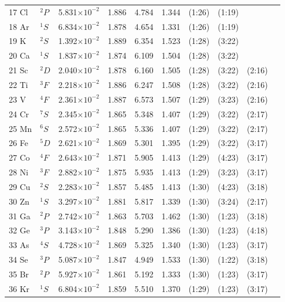 \documentclass[12pt]{report}
\begin{document}
\begin{longtable}{l l r r r r r r r r}
17 Cl & $^{2}P$ & 5.831$\times10^{-2}$ & 1.886 & 4.784 & 1.344 & (1:26) & (1:19)     \\
18 Ar & $^{1}S$ & 6.834$\times10^{-2}$ & 1.878 & 4.654 & 1.331 & (1:26) & (1:19)     \\
19 K & $^{2}S$ & 1.392$\times10^{-2}$ & 1.889 & 6.354 & 1.523 & (1:28) & (3:22)     \\
20 Ca & $^{1}S$ & 1.837$\times10^{-2}$ & 1.874 & 6.109 & 1.504 & (1:28) & (3:22)     \\
21 Sc & $^{2}D$ & 2.040$\times10^{-2}$ & 1.878 & 6.160 & 1.505 & (1:28) & (3:22) & (2:16)   \\
22 Ti & $^{3}F$ & 2.218$\times10^{-2}$ & 1.886 & 6.247 & 1.508 & (1:28) & (3:22) & (2:16)   \\
23 V & $^{4}F$ & 2.361$\times10^{-2}$ & 1.887 & 6.573 & 1.507 & (1:29) & (3:23) & (2:16)   \\
24 Cr & $^{7}S$ & 2.345$\times10^{-2}$ & 1.865 & 5.348 & 1.407 & (1:29) & (3:22) & (2:17)   \\
25 Mn & $^{6}S$ & 2.572$\times10^{-2}$ & 1.865 & 5.336 & 1.407 & (1:29) & (3:22) & (2:17)   \\
26 Fe & $^{5}D$ & 2.621$\times10^{-2}$ & 1.869 & 5.301 & 1.395 & (1:29) & (3:22) & (3:17)   \\
27 Co & $^{4}F$ & 2.643$\times10^{-2}$ & 1.871 & 5.905 & 1.413 & (1:29) & (4:23) & (3:17)   \\
28 Ni & $^{3}F$ & 2.882$\times10^{-2}$ & 1.875 & 5.935 & 1.413 & (1:29) & (3:23) & (3:17)   \\
29 Cu & $^{2}S$ & 2.283$\times10^{-2}$ & 1.857 & 5.485 & 1.413 & (1:30) & (4:23) & (3:18)   \\
30 Zn & $^{1}S$ & 3.297$\times10^{-2}$ & 1.881 & 5.817 & 1.339 & (1:30) & (3:24) & (2:17)   \\
31 Ga & $^{2}P$ & 2.742$\times10^{-2}$ & 1.863 & 5.703 & 1.462 & (1:30) & (1:23) & (3:18)   \\
32 Ge & $^{3}P$ & 3.143$\times10^{-2}$ & 1.848 & 5.290 & 1.386 & (1:30) & (1:23) & (4:18)   \\
33 As & $^{4}S$ & 4.728$\times10^{-2}$ & 1.869 & 5.325 & 1.340 & (1:30) & (1:23) & (3:17)   \\
34 Se & $^{3}P$ & 5.087$\times10^{-2}$ & 1.847 & 4.949 & 1.533 & (1:30) & (1:22) & (3:18)   \\
35 Br & $^{2}P$ & 5.927$\times10^{-2}$ & 1.861 & 5.192 & 1.333 & (1:30) & (1:23) & (3:17)   \\
36 Kr & $^{1}S$ & 6.804$\times10^{-2}$ & 1.859 & 5.510 & 1.370 & (1:29) & (1:23) & (3:17)   \\

\end{longtable}
\end{document}
